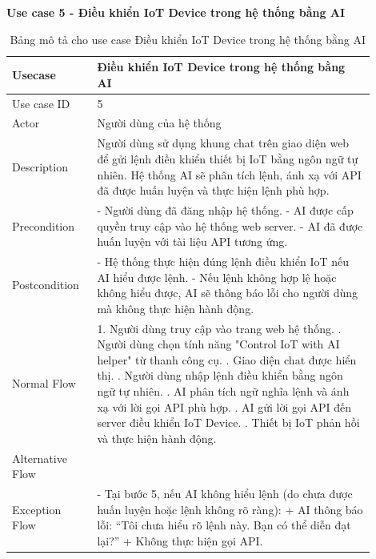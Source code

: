 \textbf{Use case 5 - Điều khiển IoT Device trong hệ thống bằng AI}

\renewcommand{\arraystretch}{1.6}
\begin{table}[H]
\centering
\begin{tabular}{|p{0.2\linewidth}|p{0.7\linewidth}|}
\hline
\rowcolor[HTML]{EFEFEF} 
\textbf{Usecase}        & \textbf{Điều khiển IoT Device trong hệ thống bằng AI} \\ \hline
Use case ID             & 5 \\ \hline
Actor                   & Người dùng của hệ thống \\ \hline
Description             & Người dùng sử dụng khung chat trên giao diện web để gửi lệnh điều khiển thiết bị IoT bằng ngôn ngữ tự nhiên. Hệ thống AI sẽ phân tích lệnh, ánh xạ với API đã được huấn luyện và thực hiện lệnh phù hợp. \\ \hline
Precondition            & 
    - Người dùng đã đăng nhập hệ thống. \newline
    - AI được cấp quyền truy cập vào hệ thống web server. \newline
    - AI đã được huấn luyện với tài liệu API tương ứng.
\\ \hline
Postcondition           &  
    - Hệ thống thực hiện đúng lệnh điều khiển IoT nếu AI hiểu được lệnh. \newline
    - Nếu lệnh không hợp lệ hoặc không hiểu được, AI sẽ thông báo lỗi cho người dùng mà không thực hiện hành động.
\\ \hline
Normal Flow             & 
    1. Người dùng truy cập vào trang web hệ thống. \newline
    2. Người dùng chọn tính năng "Control IoT with AI helper" từ thanh công cụ. \newline
    3. Giao diện chat được hiển thị. \newline
    4. Người dùng nhập lệnh điều khiển bằng ngôn ngữ tự nhiên. \newline
    5. AI phân tích ngữ nghĩa lệnh và ánh xạ với lời gọi API phù hợp. \newline
    6. AI gửi lời gọi API đến server điều khiển IoT Device. \newline
    7. Thiết bị IoT phản hồi và thực hiện hành động.
\\ \hline
Alternative Flow          & 
\\ \hline
Exception Flow          &  
- Tại bước 5, nếu AI không hiểu lệnh (do chưa được huấn luyện hoặc lệnh không rõ ràng): \newline
+ AI thông báo lỗi: “Tôi chưa hiểu rõ lệnh này. Bạn có thể diễn đạt lại?” \newline
+ Không thực hiện gọi API.
\\ \hline
\end{tabular}
\caption{Bảng mô tả cho use case Điều khiển IoT Device trong hệ thống bằng AI}
\end{table}

